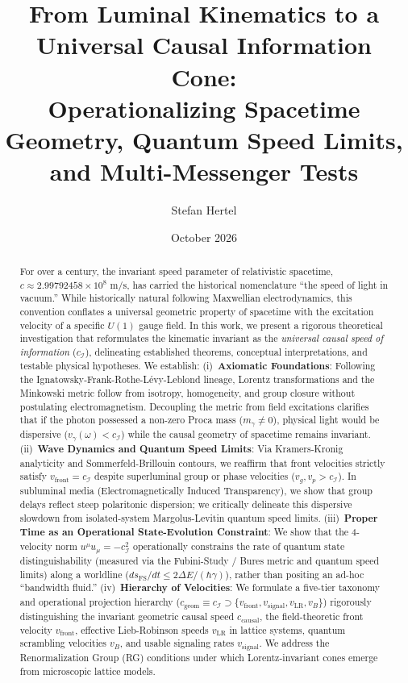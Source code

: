 \documentclass[11pt,a4paper]{article}
\title{\textbf{From Luminal Kinematics to a Universal Causal Information Cone:\\
Operationalizing Spacetime Geometry, Quantum Speed Limits, and Multi-Messenger Tests}}
\author[1]{Stefan Hertel}
\affil[1]{Independent Researcher}
\date{October 2026}
\begin{document}
\maketitle

\begin{abstract}
For over a century, the invariant speed parameter of relativistic spacetime, $c \approx 2.99792458 \times 10^8\text{ m/s}$, has carried the historical nomenclature ``the speed of light in vacuum.'' While historically natural following Maxwellian electrodynamics, this convention conflates a universal geometric property of spacetime with the excitation velocity of a specific $U(1)$ gauge field. In this work, we present a rigorous theoretical investigation that reformulates the kinematic invariant as the \emph{universal causal speed of information} ($c_{\mathcal{I}}$), delineating established theorems, conceptual interpretations, and testable physical hypotheses. We establish: 
(i)~\textbf{Axiomatic Foundations}: Following the Ignatowsky-Frank-Rothe-L\'evy-Leblond lineage, Lorentz transformations and the Minkowski metric follow from isotropy, homogeneity, and group closure without postulating electromagnetism. Decoupling the metric from field excitations clarifies that if the photon possessed a non-zero Proca mass ($m_\gamma \neq 0$), physical light would be dispersive ($v_\gamma(\omega) < c_{\mathcal{I}}$) while the causal geometry of spacetime remains invariant.
(ii)~\textbf{Wave Dynamics and Quantum Speed Limits}: Via Kramers-Kronig analyticity and Sommerfeld-Brillouin contours, we reaffirm that front velocities strictly satisfy $v_{\text{front}} = c_{\mathcal{I}}$ despite superluminal group or phase velocities ($v_g, v_p > c_{\mathcal{I}}$). In subluminal media (Electromagnetically Induced Transparency), we show that group delays reflect steep polaritonic dispersion; we critically delineate this dispersive slowdown from isolated-system Margolus-Levitin quantum speed limits.
(iii)~\textbf{Proper Time as an Operational State-Evolution Constraint}: We show that the 4-velocity norm $u^\mu u_\mu = -c_{\mathcal{I}}^2$ operationally constrains the rate of quantum state distinguishability (measured via the Fubini-Study / Bures metric and quantum speed limits) along a worldline ($ds_{\text{FS}}/dt \le 2\Delta E / (\hbar \gamma)$), rather than positing an ad-hoc ``bandwidth fluid.''
(iv)~\textbf{Hierarchy of Velocities}: We formulate a five-tier taxonomy and operational projection hierarchy ($c_{\text{geom}} \equiv c_{\mathcal{I}} \supset \{v_{\text{front}}, v_{\text{signal}}, v_{\text{LR}}, v_B\}$) rigorously distinguishing the invariant geometric causal speed $c_{\text{causal}}$, the field-theoretic front velocity $v_{\text{front}}$, effective Lieb-Robinson speeds $v_{\text{LR}}$ in lattice systems, quantum scrambling velocities $v_B$, and usable signaling rates $v_{\text{signal}}$. We address the Renormalization Group (RG) conditions under which Lorentz-invariant cones emerge from microscopic lattice models.

\end{abstract}
\end{document}
